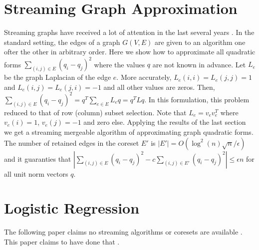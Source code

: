 \documentclass{article} %
\newcommand{\ip}[1]{\left \langle #1 \right \rangle}
\newcommand{\eps}{\epsilon}
\begin{document}
\section{Streaming Graph Approximation}
Streaming graphs have received a lot of attention in the last several years \cite{}. 
In the standard setting, the edges of a graph $G(V,E)$ are given to an algorithm one ofter the other in arbitrary order.
Here we show how to approximate all quadratic forms $\sum_{(i,j) \in E} (q_i - q_j)^2$ where the values $q$ are not known in advance.
Let $L_e$ be the graph Laplacian of the edge $e$. More accurately, $L_e(i,i) = L_e(j,j) = 1$ and  $L_e(i,j) = L_e(j,i) = -1$ and all other values are zeros.
Then, $\sum_{(i,j) \in E} (q_i - q_j)^2 = q^T \sum_{e \in E}L_e q = q^T L q$. 
In this formulation, this problem reduced to that of row (column) subset selection. 
Note that $L_e = v_ev_e^T$ where $v_e(i) = 1$, $v_e(j)=-1$ and zero else.
Applying the results of the last section we get a streaming mergeable algorithm of approximating graph quadratic forms.
The number of retained edges in the coreset $E'$ is $|E'| = O(\log^{2}(n) \sqrt{n}/\eps)$ and it guaranties that 
$|\sum_{(i,j) \in E} (q_i - q_j)^2  - c \sum_{(i,j) \in E'} (q_i - q_j)^2| \le \eps n$ for all unit norm vectors $q$.

\section{Logistic Regression}
The following paper claims no streaming algorithms or coresets are available \cite{DBLP:journals/corr/abs-1805-08571}.
This paper claims to have done that \cite{DBLP:conf/nips/HugginsCB16}.


\end{document}

